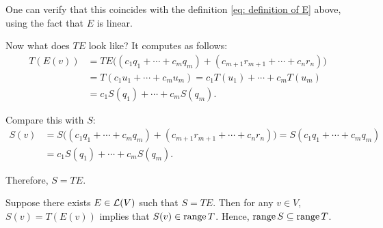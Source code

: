 \begin{xrcs}
\begin{xprf}
    One can verify that this coincides with the definition \eqref{eq: definition of E} above, using the fact that $E$ is linear.

    Now what does $TE$ look like? It computes as follows:
    \begin{equation}
      \begin{aligned}
        T(E(v)) &= TE\Big((c_1 q_1 + \cdots + c_m q_m) + (c_{m+1} r_{m+1} + \cdots + c_n r_n)\Big) \\
        &= T(c_1 u_1 + \cdots + c_m u_m) = c_1 T (u_1) + \cdots + c_m T (u_m) \\
        &= c_1 S (q_1) + \cdots + c_m S (q_m).
      \end{aligned}
    \end{equation}

    Compare this with $S$:
    \begin{equation}
      \begin{aligned}
        S(v) &= S\Big((c_1 q_1 + \cdots + c_m q_m) + (c_{m+1} r_{m+1} + \cdots + c_n r_n)\Big)
        = S(c_1 q_1 + \cdots + c_m q_m) \\
        &= c_1 S (q_1) + \cdots + c_m S (q_m).
      \end{aligned}
    \end{equation}

    Therefore, $S = TE$.

    \Leftarrowdirection Suppose there exists $E \in \mathcal{L} (V)$ such that $S=TE$. Then for any $v \in V$, $S(v) = T(E(v))$ implies that $S(v) \in \operatorname{range} T$. Hence, $\operatorname{range} S \subseteq \operatorname{range} T$.
  \end{xprf}
\end{xrcs}


